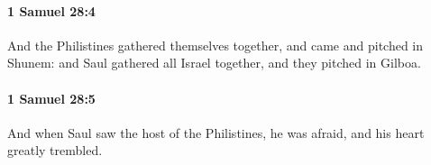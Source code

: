 		\paragraph{1 Samuel 28:4} %
			\label{1SAMUEL-28-4}

			And the Philistines gathered themselves together, and came and pitched in Shunem: and Saul gathered all Israel together, and they pitched in Gilboa.


		\paragraph{1 Samuel 28:5} %
			\label{1SAMUEL-28-5}

			And when Saul saw the host of the Philistines, he was afraid, and his heart greatly trembled.


